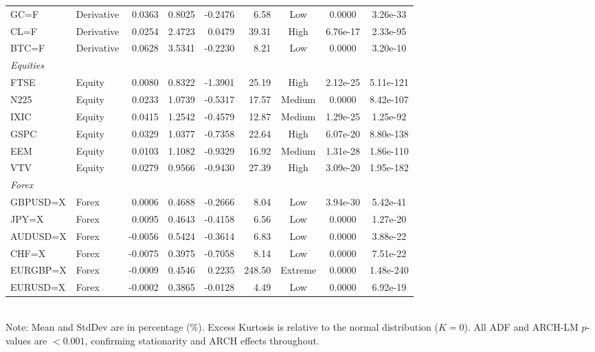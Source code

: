 \documentclass[12pt, a4paper]{article}
\begin{document}
\begin{table}[ht]
{\begin{tabular}{llrrrrccc}
GC=F  & Derivative & 0.0363 & 0.8025 & -0.2476 & 6.58  & Low    & 0.0000  & 3.26e-33  \\
CL=F  & Derivative & 0.0254 & 2.4723 & 0.0479  & 39.31 & High   & 6.76e-17 & 2.33e-95  \\
BTC=F & Derivative & 0.0628 & 3.5341 & -0.2230 & 8.21  & Low    & 0.0000  & 3.20e-10  \\ \midrule
\multicolumn{9}{l}{\textit{Equities}} \\
FTSE  & Equity & 0.0080 & 0.8322 & -1.3901 & 25.19 & High   & 2.12e-25 & 5.11e-121 \\
N225  & Equity & 0.0233 & 1.0739 & -0.5317 & 17.57 & Medium & 0.0000  & 8.42e-107 \\
IXIC  & Equity & 0.0415 & 1.2542 & -0.4579 & 12.87 & Medium & 1.29e-25 & 1.25e-92  \\
GSPC  & Equity & 0.0329 & 1.0377 & -0.7358 & 22.64 & High   & 6.07e-20 & 8.80e-138 \\
EEM   & Equity & 0.0103 & 1.1082 & -0.9329 & 16.92 & Medium & 1.31e-28 & 1.86e-110 \\
VTV   & Equity & 0.0279 & 0.9566 & -0.9430 & 27.39 & High   & 3.09e-20 & 1.95e-182 \\ \midrule
\multicolumn{9}{l}{\textit{Forex}} \\
GBPUSD=X & Forex & 0.0006 & 0.4688 & -0.2666 & 8.04  & Low    & 3.94e-30 & 5.42e-41  \\
JPY=X    & Forex & 0.0095 & 0.4643 & -0.4158 & 6.56  & Low    & 0.0000  & 1.27e-20  \\
AUDUSD=X & Forex & -0.0056 & 0.5424 & -0.3614 & 6.83  & Low    & 0.0000  & 3.88e-22  \\
CHF=X    & Forex & -0.0075 & 0.3975 & -0.7058 & 8.14  & Low    & 0.0000  & 7.51e-22  \\
EURGBP=X & Forex & -0.0009 & 0.4546 & 0.2235  & 248.50& Extreme& 0.0000  & 1.48e-240 \\
EURUSD=X & Forex & -0.0002 & 0.3865 & -0.0128 & 4.49  & Low    & 0.0000  & 6.92e-19  \\
\bottomrule
\end{tabular}
}%
\smallskip\\
\footnotesize Note: Mean and StdDev are in percentage (\%). Excess Kurtosis is relative to the normal distribution ($K=0$). All ADF and ARCH-LM $p$-values are $< 0.001$, confirming stationarity and ARCH effects throughout.
\end{table}

\end{document}
